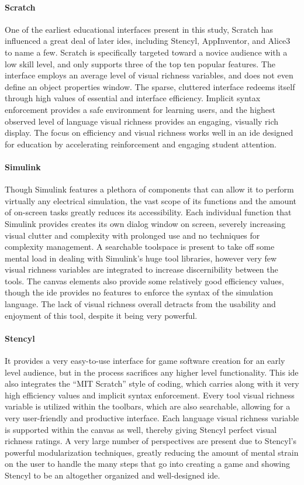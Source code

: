 \paragraph{Scratch} One of the earliest educational interfaces present in
this study, Scratch has influenced a great deal of later \acp{ide},
including Stencyl, AppInventor, and Alice3 to name a few. Scratch is
specifically targeted toward a novice audience with a low skill level, and
only supports three of the top ten popular features. The interface employs
an average level of visual richness variables, and does not even define an
object properties window. The sparse, cluttered interface redeems itself
through high values of essential and interface efficiency. Implicit syntax
enforcement provides a safe environment for learning users, and the highest
observed level of language visual richness provides an engaging, visually
rich display. The focus on efficiency and visual richness works well in an
\ac{ide} designed for education by accelerating reinforcement and engaging
student attention.

\paragraph{Simulink} Though Simulink features a plethora of components that
can allow it to perform virtually any electrical simulation, the vast scope
of its functions and the amount of on-screen tasks greatly reduces its
accessibility. Each individual function that Simulink provides creates its
own dialog window on screen, severely increasing visual clutter and
complexity with prolonged use and no techniques for complexity management.
A searchable toolspace is present to take off some mental load in dealing
with Simulink's huge tool libraries, however very few visual richness
variables are integrated to increase discernibility between the tools. The
canvas elements also provide some relatively good efficiency values, though
the \ac{ide} provides no features to enforce the syntax of the simulation
language. The lack of visual richness overall detracts from the usability
and enjoyment of this tool, despite it being very powerful.

\paragraph{Stencyl} It provides a very easy-to-use interface for game
software creation for an early level audience, but in the process
sacrifices any higher level functionality. This \ac{ide} also integrates
the ``MIT Scratch'' style of coding, which carries along with it very high
efficiency values and implicit syntax enforcement. Every tool visual
richness variable is utilized within the toolbars, which are also
searchable, allowing for a very user-friendly and productive interface.
Each language visual richness variable is supported within the canvas as
well, thereby giving Stencyl perfect visual richness ratings. A very large
number of perspectives are present due to Stencyl's powerful modularization
techniques, greatly reducing the amount of mental strain on the user to
handle the many steps that go into creating a game and showing Stencyl to
be an altogether organized and well-designed \ac{ide}.

